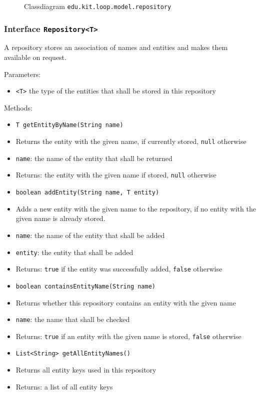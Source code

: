 \documentclass[parskip=full,11pt]{scrartcl}
\begin{document}
\iftrue
\begin{figure}[h]
	\centering
	\fontsize{7.5}{8}\selectfont
	

	\caption{Classdiagram \texttt{edu.kit.loop.model.repository}}
\end{figure}
\fi
\newpage
\subsubsection{Interface \texttt{Repository<T>}}

A repository stores an association of names and entities and makes them available on request.

Parameters:
\begin{itemize}\itemsep -10pt
	\item \texttt{<T>} the type of the entities that shall be stored in this repository
\end{itemize}

\newpage
Methods:
\begin{itemize}\itemsep -10pt
	\item \texttt{T getEntityByName(String name)}
	\item[] Returns the entity with the given name, if currently stored, \texttt{null} otherwise
	\item[] \texttt{name}: the name of the entity that shall be returned
	\item[] Returns: the entity with the given name if stored, \texttt{null} otherwise

	\item \texttt{boolean addEntity(String name, T entity)}
	\item[] Adds a new entity with the given name to the repository, if no entity with the given name is already stored.
	\item[] \texttt{name}: the name of the entity that shall be added
	\item[] \texttt{entity}: the entity that shall be added
	\item[] Returns: \texttt{true} if the entity was successfully added, \texttt{false} otherwise

	\item \texttt{boolean containsEntityName(String name)}
	\item[] Returns whether this repository contains an entity with the given name
	\item[] \texttt{name}: the name that shall be checked
	\item[] Returns: \texttt{true} if an entity with the given name is stored, \texttt{false} otherwise

	\item \texttt{List<String> getAllEntityNames()}
	\item[] Returns all entity keys used in this repository
	\item[] Returns: a list of all entity keys

\end{itemize}
\end{document}
